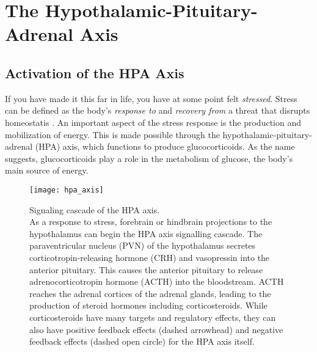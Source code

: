 \documentclass[12pt,twoside]{reedthesis}
\begin{document}

\section{The Hypothalamic-Pituitary-Adrenal Axis}

 \subsection{Activation of the HPA Axis}
If you have made it this far in life, you have at some point felt
\textit{stressed}. Stress can be
defined as the body's \textit{response to} and \textit{recovery from} a threat that disrupts
homeostatis \citep{van_bodegom_modulation_2017}. An important aspect of the stress response is the production and mobilization
 of energy. This is made possible through the hypothalamic-pituitary-adrenal (HPA)
 axis, which functions to produce glucocorticoids. As the name suggests,
 glucocorticoids play a role in the metabolism of glucose, the body's main
 source of energy.
\begin{figure}[htbp] 
\begin{centering} 
\texttt{[image: hpa\_axis]}
\caption[Signaling cascade of the HPA axis]{\footnotesize{Signaling cascade of the HPA axis.\\ As a response to
  stress, forebrain or hindbrain projections to the hypothalamus can begin the
  HPA axis signalling cascade. The paraventricular nucleus (PVN) of the
  hypothalamus secretes corticotropin-releasing hormone (CRH) and vasopressin
  into the anterior pituitary. This causes the anterior pituitary to release
  adrenocorticotropin hormone (ACTH) into the bloodstream. ACTH reaches the
  adrenal cortices of the adrenal glands, leading to the production of steroid
  hormones including corticosteroids. While corticosteroids have many targets
  and regulatory effects, they can also have positive feedback
effects (dashed arrowhead) and negative feedback effects (dashed open circle)
for the HPA axis itself.}}
\label{subd}
\end{centering} 
\end{figure}
\end{document}
